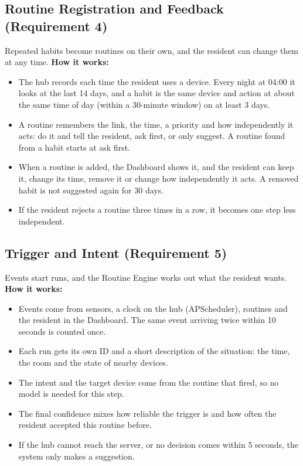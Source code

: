 \documentclass[conference]{IEEEtran}
\begin{document}
\subsection{Routine Registration and Feedback (Requirement 4)}
Repeated habits become routines on their own, and the resident can change them at any time.
\textbf{How it works:}
\begin{itemize}
\item The hub records each time the resident uses a device. Every night at 04:00 it looks at the last 14 days, and a habit is the same device and action at about the same time of day (within a 30-minute window) on at least 3 days.
\item A routine remembers the link, the time, a priority and how independently it acts: do it and tell the resident, ask first, or only suggest. A routine found from a habit starts at ask first.
\item When a routine is added, the Dashboard shows it, and the resident can keep it, change its time, remove it or change how independently it acts. A removed habit is not suggested again for 30 days.
\item If the resident rejects a routine three times in a row, it becomes one step less independent.
\end{itemize}

\subsection{Trigger and Intent (Requirement 5)}
Events start runs, and the Routine Engine works out what the resident wants.
\textbf{How it works:}
\begin{itemize}
\item Events come from sensors, a clock on the hub (APScheduler), routines and the resident in the Dashboard. The same event arriving twice within 10 seconds is counted once.
\item Each run gets its own ID and a short description of the situation: the time, the room and the state of nearby devices.
\item The intent and the target device come from the routine that fired, so no model is needed for this step.
\item The final confidence mixes how reliable the trigger is and how often the resident accepted this routine before.
\item If the hub cannot reach the server, or no decision comes within 5 seconds, the system only makes a suggestion.
\end{itemize}
\end{document}
